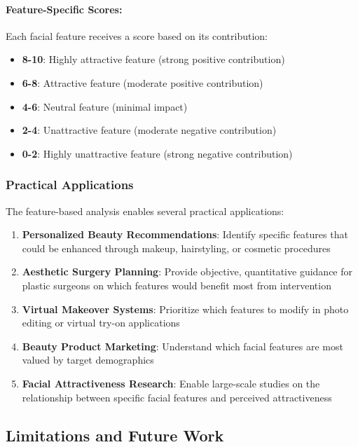 \paragraph{Feature-Specific Scores:}
Each facial feature receives a score based on its contribution:
\begin{itemize}
    \item \textbf{8-10}: Highly attractive feature (strong positive contribution)
    \item \textbf{6-8}: Attractive feature (moderate positive contribution)
    \item \textbf{4-6}: Neutral feature (minimal impact)
    \item \textbf{2-4}: Unattractive feature (moderate negative contribution)
    \item \textbf{0-2}: Highly unattractive feature (strong negative contribution)
\end{itemize}

\subsubsection{Practical Applications}

The feature-based analysis enables several practical applications:

\begin{enumerate}
    \item \textbf{Personalized Beauty Recommendations}: Identify specific features that could be enhanced through makeup, hairstyling, or cosmetic procedures
    
    \item \textbf{Aesthetic Surgery Planning}: Provide objective, quantitative guidance for plastic surgeons on which features would benefit most from intervention
    
    \item \textbf{Virtual Makeover Systems}: Prioritize which features to modify in photo editing or virtual try-on applications
    
    \item \textbf{Beauty Product Marketing}: Understand which facial features are most valued by target demographics
    
    \item \textbf{Facial Attractiveness Research}: Enable large-scale studies on the relationship between specific facial features and perceived attractiveness
\end{enumerate}

\subsection{Limitations and Future Work}

